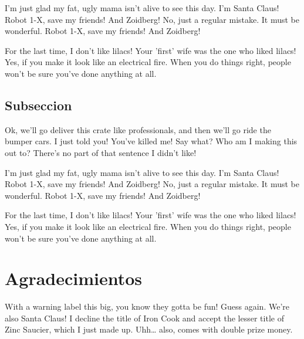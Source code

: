 \documentclass[10pt]{informe_db}
\begin{document}
I'm just glad my fat, ugly mama isn't alive to see this day. I'm Santa Claus! Robot 1-X, save my friends! And Zoidberg! No, just a regular mistake. It must be wonderful. Robot 1-X, save my friends! And Zoidberg!

For the last time, I don't like lilacs! Your 'first' wife was the one who liked lilacs! Yes, if you make it look like an electrical fire. When you do things right, people won't be sure you've done anything at all.


\subsection{Subseccion}
Ok, we'll go deliver this crate like professionals, and then we'll go ride the bumper cars. I just told you! You've killed me! Say what? Who am I making this out to? There's no part of that sentence I didn't like!

I'm just glad my fat, ugly mama isn't alive to see this day. I'm Santa Claus! Robot 1-X, save my friends! And Zoidberg! No, just a regular mistake. It must be wonderful. Robot 1-X, save my friends! And Zoidberg!

For the last time, I don't like lilacs! Your 'first' wife was the one who liked lilacs! Yes, if you make it look like an electrical fire. When you do things right, people won't be sure you've done anything at all.





\section*{Agradecimientos} 

With a warning label this big, you know they gotta be fun! Guess again. We're also Santa Claus! I decline the title of Iron Cook and accept the lesser title of Zinc Saucier, which I just made up. Uhh… also, comes with double prize money.



\nocite{*}
\end{document}
